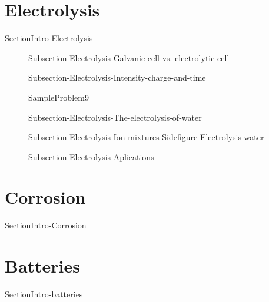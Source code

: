 \documentclass[main.tex]{subfiles}
\begin{document}
 \section{Electrolysis}{SectionIntro-Electrolysis}
\sloppy\begin{description}
    \item[] {Subsection-Electrolysis-Galvanic-cell-vs.-electrolytic-cell}
     \item[] {Subsection-Electrolysis-Intensity-charge-and-time}
    
     {SampleProblem9}

     \item[] {Subsection-Electrolysis-The-electrolysis-of-water}
     \item[] {Subsection-Electrolysis-Ion-mixtures}
     {Sidefigure-Electrolysis-water}

     \item[] {Subsection-Electrolysis-Aplications}
 
\end{description}


 \section{Corrosion}{SectionIntro-Corrosion}
 \section{Batteries}{SectionIntro-batteries}







\checkoddpage\ifoddpage \clearpage\thispagestyle{empty}\mbox{}\clearpage \else  \fi 
\end{document}
